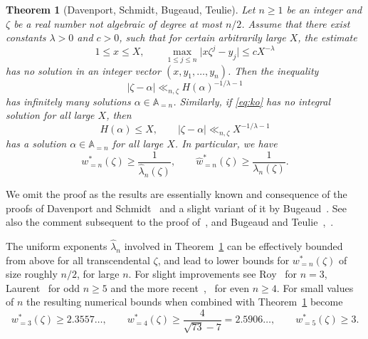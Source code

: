 \documentclass[12pt]{amsart}
\newtheorem{theorem}{Theorem}[section]
\theoremstyle{definition}
\begin{document}
\begin{theorem}[Davenport, Schmidt, Bugeaud, Teulie]  \label{korola}
Let $n\geq 1$ be an integer and
$\zeta$ be a real number not algebraic of degree at most $n/2$.
Assume that there
exist constants $\lambda>0$ and $c>0$, such that for certain arbitrarily large $X$, the estimate
%
\begin{equation} \label{eq:ko}
1\leq x\leq X, \qquad \max_{1\leq j\leq n} \vert x\zeta^{j}-y_{j}\vert \leq cX^{-\lambda}
\end{equation}
%  
has no solution in an integer vector $(x,y_{1},\ldots,y_{n})$.
Then the inequality
%
\begin{equation} \label{eq:neugebauer} 
\vert \zeta-\alpha\vert \ll_{n,\zeta} H(\alpha)^{-1/\lambda-1}
\end{equation}
%  
has infinitely many solutions $\alpha\in\mathbb{A}_{=n}$.
Similarly, if \eqref{eq:ko} has no integral solution for all large $X$, then 
%
\begin{equation} \label{eq:formuni}
H(\alpha)\leq X, \qquad \vert \zeta-\alpha\vert \ll_{n,\zeta} X^{-1/\lambda-1} 
\end{equation}
%
has a solution $\alpha\in\mathbb{A}_{=n}$ for all large $X$. In particular, we have 
%
\begin{equation} \label{eq:jodad}
w_{=n}^{\ast}(\zeta)\geq \frac{1}{\widehat{\lambda}_{n}(\zeta)}, \qquad \widehat{w}_{=n}^{\ast}(\zeta)\geq \frac{1}{\lambda_{n}(\zeta)}.
\end{equation}
% 
\end{theorem}

We omit the proof as the results are essentially known
and consequence
of the proofs of Davenport and Schmidt~\cite[Lemma~1]{davsh}
and a slight variant of it by Bugeaud~\cite[Theorem~2.11]{bugbuch}. 
See also the comment subsequent 
to the proof of~\cite[Theorem~2.11]{bugbuch}, and
Bugeaud and Teulie~\cite{teu},~\cite{teuallein}.

The uniform exponents $\widehat{\lambda}_{n}$ involved 
in Theorem~\ref{korola} can be effectively bounded from above for all 
transcendental $\zeta$,
and lead to lower bounds for $w_{=n}^{\ast}(\zeta)$ of size roughly $n/2$, for large $n$. For slight improvements see
Roy~\cite{damiroy} for $n=3$, Laurent~\cite{lau} 
for odd $n\geq 5$ and the more 
recent~\cite{ichrelation},~\cite[Section~4.2]{ichspec}
for even $n\geq 4$. For small
values of $n$ the resulting numerical bounds when
combined with Theorem~\ref{korola} become
%
\[
w_{=3}^{\ast}(\zeta) \geq 2.3557\ldots, \qquad
w_{=4}^{\ast}(\zeta) \geq 
\frac{4}{\sqrt{73}-7}= 2.5906\ldots,\qquad w_{=5}^{\ast}(\zeta) \geq 
3.
\]
%
\end{document}
